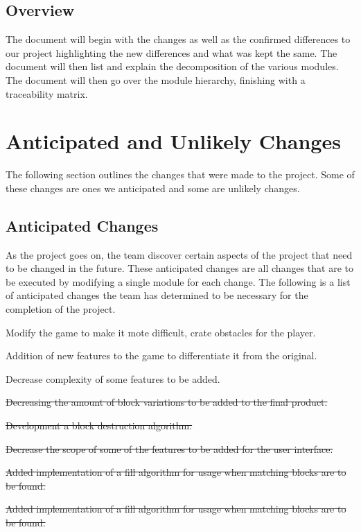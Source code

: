 \documentclass[12pt, titlepage]{article}
\begin{document}
\subsection{Overview}
The document will begin with the changes as well as the confirmed differences to our project highlighting the new differences and what was kept the same. The document will then list and explain the decomposition of the various modules. The document will then go over the module hierarchy, finishing with a traceability matrix.



\section{Anticipated and Unlikely Changes}
The following section outlines the changes that were made to the project. Some of these changes are ones we anticipated and some are unlikely changes.

\subsection{Anticipated Changes}
As the project goes on, the team discover certain aspects of the project that need to be changed in the future. These anticipated changes are all changes that are to be executed by modifying a single module for each change. The following is a list of anticipated changes the team has determined to be necessary for the completion of the project.

\begin{enumerate}[label=\textbf{AC\arabic*:}]
{\color{blue}
  \item Modify the game to make it mote difficult, crate obstacles for the player.
  \item Addition of new features to the game to differentiate it from the original.
  \item Decrease complexity of some features to be added.
  
}
  
  
  
  
  \item \sout{Decreasing the amount of block variations to be added to the final product.}
  \item \sout{Development a block destruction algorithm.}
  \item \sout{Decrease the scope of some of the features to be added for the user interface.}
  \item \sout{Added implementation of a fill algorithm for usage when matching blocks are to be found.}
  \item \sout{Added implementation of a fill algorithm for usage when matching blocks are to be found.}
\end{enumerate}
\end{document}
